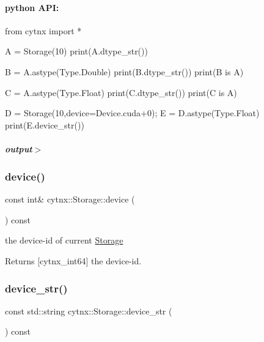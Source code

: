  \paragraph*{python A\+PI\+:}


\begin{DoxyCodeInclude}
\textcolor{keyword}{from} cytnx \textcolor{keyword}{import} *


A = Storage(10)
print(A.dtype\_str())

B = A.astype(Type.Double)
print(B.dtype\_str())
print(B \textcolor{keywordflow}{is} A)

C = A.astype(Type.Float)
print(C.dtype\_str())
print(C \textcolor{keywordflow}{is} A)

D = Storage(10,device=Device.cuda+0);
E = D.astype(Type.Float)
print(E.device\_str())

\end{DoxyCodeInclude}
 \subparagraph*{output$>$}


\begin{DoxyVerbInclude}
\end{DoxyVerbInclude}
 \mbox{\label{classcytnx_1_1Storage_a4c3e27582d7f951e6b76ccbb92f7c537}} 
\subsubsection{\texorpdfstring{device()}{device()}}
{\footnotesize\ttfamily const int\& cytnx\+::\+Storage\+::device (\begin{DoxyParamCaption}{ }\end{DoxyParamCaption}) const\hspace{0.3cm}{\ttfamily [inline]}}



the device-\/id of current \hyperlink{classcytnx_1_1Storage}{Storage} 

\begin{DoxyReturn}{Returns}
\mbox{[}cytnx\+\_\+int64\mbox{]} the device-\/id. 
\end{DoxyReturn}
\mbox{\label{classcytnx_1_1Storage_ae0d90d5275fa7e52a0a2dc10512ba71f}} 
\subsubsection{\texorpdfstring{device\+\_\+str()}{device\_str()}}
{\footnotesize\ttfamily const std\+::string cytnx\+::\+Storage\+::device\+\_\+str (\begin{DoxyParamCaption}{ }\end{DoxyParamCaption}) const\hspace{0.3cm}{\ttfamily [inline]}}



